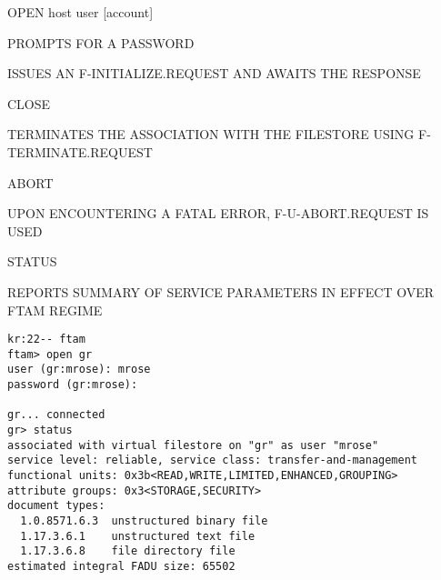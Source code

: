 \begin{bwslide}

\begin{nrtc}
\item	OPEN host user [account]
    \begin{nrtc}
    \item	PROMPTS FOR A PASSWORD

    \item	ISSUES AN F-INITIALIZE.REQUEST AND AWAITS THE RESPONSE
    \end{nrtc}

\item	CLOSE
    \begin{nrtc}
    \item	TERMINATES THE ASSOCIATION WITH THE FILESTORE USING
		F-TERMINATE.REQUEST
    \end{nrtc}

\item	ABORT
    \begin{nrtc}
    \item	UPON ENCOUNTERING A FATAL ERROR, F-U-ABORT.REQUEST IS USED
    \end{nrtc}

\item	STATUS
    \begin{nrtc}
    \item	REPORTS SUMMARY OF SERVICE PARAMETERS IN EFFECT OVER FTAM
		REGIME
    \end{nrtc}
\end{nrtc}
\end{bwslide}


\begin{bwslide}
\small

\begin{verbatim}
kr:22-- ftam
ftam> open gr
user (gr:mrose): mrose
password (gr:mrose): 

gr... connected
gr> status
associated with virtual filestore on "gr" as user "mrose"
service level: reliable, service class: transfer-and-management
functional units: 0x3b<READ,WRITE,LIMITED,ENHANCED,GROUPING>
attribute groups: 0x3<STORAGE,SECURITY>
document types:
  1.0.8571.6.3  unstructured binary file
  1.17.3.6.1    unstructured text file
  1.17.3.6.8    file directory file
estimated integral FADU size: 65502
\end{verbatim}
\end{bwslide}


